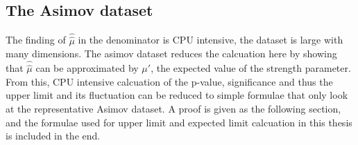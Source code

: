 








%
%
%
%





\subsection{The Asimov dataset}

The finding of $\hat\hat{\mu}$ in the denominator is CPU intensive, the dataset is large with many dimensions. The asimov dataset reduces the calcuation here by showing that $\hat\hat{\mu}$ can be approximated by $\mu'$, the expected value of the strength parameter. From this, CPU intensive calcuation of the p-value, significance and thus the upper limit and its fluctuation can be reduced to simple formulae that only look at the representative Asimov dataset. 
A proof is given as the following section, and the formulae used for upper limit and expected limit calcuation in this thesis is included in the end. 

